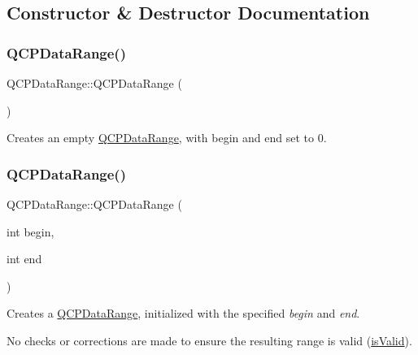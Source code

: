 \subsection{Constructor \& Destructor Documentation}
\mbox{\label{class_q_c_p_data_range_a49e72fd9bace1da9d875136dcc04c986}} 
\subsubsection{\texorpdfstring{Q\+C\+P\+Data\+Range()}{QCPDataRange()}\hspace{0.1cm}{\footnotesize\ttfamily [1/2]}}
{\footnotesize\ttfamily Q\+C\+P\+Data\+Range\+::\+Q\+C\+P\+Data\+Range (\begin{DoxyParamCaption}{ }\end{DoxyParamCaption})}

Creates an empty \hyperlink{class_q_c_p_data_range}{Q\+C\+P\+Data\+Range}, with begin and end set to 0. \mbox{\label{class_q_c_p_data_range_a6c7f4a3684210423270515403060e9cf}} 
\subsubsection{\texorpdfstring{Q\+C\+P\+Data\+Range()}{QCPDataRange()}\hspace{0.1cm}{\footnotesize\ttfamily [2/2]}}
{\footnotesize\ttfamily Q\+C\+P\+Data\+Range\+::\+Q\+C\+P\+Data\+Range (\begin{DoxyParamCaption}\item[{int}]{begin,  }\item[{int}]{end }\end{DoxyParamCaption})}

Creates a \hyperlink{class_q_c_p_data_range}{Q\+C\+P\+Data\+Range}, initialized with the specified {\itshape begin} and {\itshape end}.

No checks or corrections are made to ensure the resulting range is valid (\hyperlink{class_q_c_p_data_range_aae53a37472212dca0a7939963e20dba0}{is\+Valid}). 

